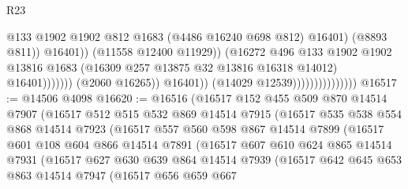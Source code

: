 \begin{lexlean}{R23}
\begin{coremodule}
                                                            @133
                                                            @1902
                                                            @1902
                                                            @812
                                                            @1683
                                                            (@4486 @16240 @698 @812)
                                                            @16401)
                                                          (@8893 @811))
                                                        @16401))
                                                    (@11558 @12400 @11929))
                                                  (@16272
                                                    @496
                                                    @133
                                                    @1902
                                                    @1902
                                                    @13816
                                                    @1683
                                                    (@16309 @257 @13875 @32 @13816 @16318 @14012)
                                                    @16401)))))))
                                      (@2060 @16265))
                                    @16401))
                                (@14029 @12539)))))))))))))))
@16517 := @14506 @4098
@16620 := @16516
    (@16517
      @152
      @455
      @509
      @870
      @14514
      @7907
      (@16517
        @512
        @515
        @532
        @869
        @14514
        @7915
        (@16517
          @535
          @538
          @554
          @868
          @14514
          @7923
          (@16517
            @557
            @560
            @598
            @867
            @14514
            @7899
            (@16517
              @601
              @108
              @604
              @866
              @14514
              @7891
              (@16517
                @607
                @610
                @624
                @865
                @14514
                @7931
                (@16517
                  @627
                  @630
                  @639
                  @864
                  @14514
                  @7939
                  (@16517
                    @642
                    @645
                    @653
                    @863
                    @14514
                    @7947
                    (@16517
                      @656
                      @659
                      @667

\end{coremodule}
\end{lexlean}
